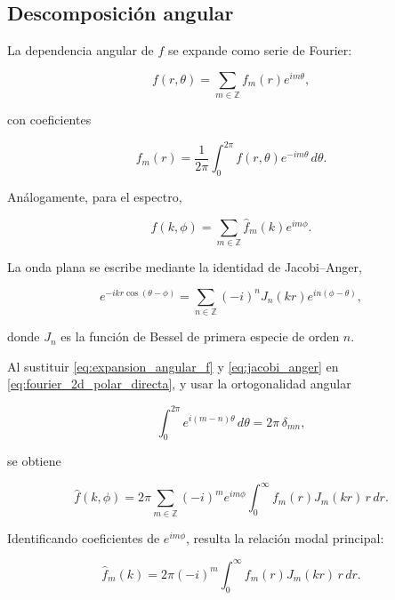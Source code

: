 \subsection{Descomposición angular}
\label{subsec:fourier_2d_polar_modal}

La dependencia angular de $f$ se expande como serie de Fourier:

\begin{equation}
  f(r,\theta)=\sum_{m\in\mathbb{Z}} f_m(r)e^{im\theta},
  \label{eq:expansion_angular_f}
\end{equation}

con coeficientes

\begin{equation}
  f_m(r)=\frac{1}{2\pi}\int_0^{2\pi} f(r,\theta)e^{-im\theta}\,d\theta.
  \label{eq:coeficientes_angulares_f}
\end{equation}

Análogamente, para el espectro,

\begin{equation}
  \hat f(k,\phi)=\sum_{m\in\mathbb{Z}} \hat f_m(k)e^{im\phi}.
  \label{eq:expansion_angular_fhat}
\end{equation}

La onda plana se escribe mediante la identidad de Jacobi--Anger,

\begin{equation}
  e^{-ikr\cos(\theta-\phi)}=
  \sum_{n\in\mathbb{Z}}(-i)^nJ_n(kr)e^{in(\phi-\theta)},
  \label{eq:jacobi_anger}
\end{equation}

donde $J_n$ es la funci\'on de Bessel de primera especie de orden $n$.

Al sustituir \eqref{eq:expansion_angular_f} y \eqref{eq:jacobi_anger} en \eqref{eq:fourier_2d_polar_directa}, y usar la ortogonalidad angular

\begin{equation}
  \int_0^{2\pi} e^{i(m-n)\theta}\,d\theta=2\pi\,\delta_{mn},
\end{equation}

se obtiene

\begin{equation}
  \hat f(k,\phi)=2\pi\sum_{m\in\mathbb{Z}}(-i)^m e^{im\phi}
  \int_0^\infty f_m(r)J_m(kr)\,r\,dr.
\end{equation}

Identificando coeficientes de $e^{im\phi}$, resulta la relación modal principal:

\begin{equation}
  \hat f_m(k)=2\pi(-i)^m\int_0^\infty f_m(r)J_m(kr)\,r\,dr.
  \label{eq:fourier_modal_directa}
\end{equation}

